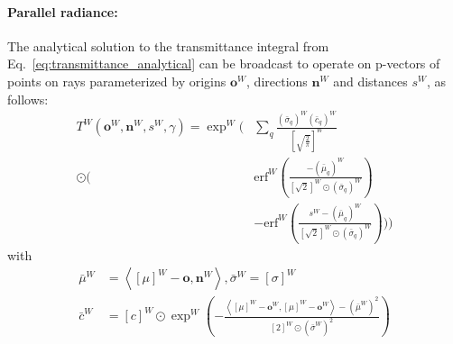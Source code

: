 \documentclass[a4paper, 11pt]{memoir}
\newcommand*{\erf}{\text{erf}}
\begin{document}
    \paragraph{Parallel \gls{radiance}:}
    \label{par:parallel_radiance}
    The analytical solution to the \gls{transmittance} integral from Eq.~\eqref{eq:transmittance_analytical} can be broadcast
    to operate on p-vectors of points on rays parameterized by origins $\mathbf{o}^W$, directions $\mathbf{n}^W$
    and distances $s^W$, as follows:
    \begin{equation}
        \begin{aligned}
            T^W(\mathbf{o}^W, \mathbf{n}^W, s^W, \gamma) = \exp^W\Bigg(& \sum_q \frac{(\bar{\sigma}_q)^W
            (\bar{c}_q)^W}{\left[ \sqrt{\frac{2}{\pi}} \right]^W} \\
            \odot \Bigg(& \erf^W{\left( \frac{-(\bar{\mu}_q)^W}{[ \sqrt{2} ]^W \odot (\bar{\sigma}_q)^W} \right)}\\
            &- \erf^W{\left( \frac{s^W - (\bar{\mu}_q)^W}{[ \sqrt{2} ]^W \odot (\bar{\sigma}_q)^W} \right)} \Bigg) \Bigg) 
        \end{aligned}
        \label{eq:transmittance_broadcast}
    \end{equation}
    with
    \begin{align*}
        \bar{\mu}^W &= \left\langle [ \mu ]^W - \mathbf{o}, \mathbf{n}^W \right\rangle, \bar{\sigma}^W = \left[ \sigma \right]^W\\
        \bar{c}^W &= [c]^W \odot \exp^W{\left( - \frac{\left\langle [\mu]^W - \mathbf{o}^W, [\mu]^W - \mathbf{o}^W \right\rangle
    - \left(\bar{\mu}^W\right)^2}{[2]^W \odot \left(\bar{\sigma}^W\right)^2} \right)}
    \end{align*}
\end{document}
